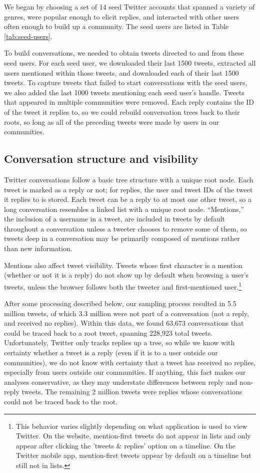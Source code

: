 \documentclass[11pt,letterpaper]{article}
\begin{document}
We began by choosing a set of 14 seed Twitter accounts that spanned a variety of genres, were popular enough to elicit replies, and interacted with other users often enough to build up a community.  The seed users are listed in Table \ref{tab:seed-users}.  

To build conversations, we needed to obtain tweets directed to and from these seed users. For each seed user, we downloaded their last 1500 tweets, extracted all users mentioned within those tweets, and downloaded each of their last 1500 tweets.  To capture tweets that failed to start conversations with the seed users, we also added the last 1000 tweets mentioning each seed user's handle.  Tweets that appeared in multiple communities were removed.  Each reply contains the ID of the tweet it replies to, so we could rebuild conversation trees back to their roots, so long as all of the preceding tweets were made by users in our communities.

\subsection{Conversation structure and visibility}\label{sect:conversation}

Twitter conversations follow a basic tree structure with a unique root node. Each tweet is marked as a reply or not; for replies, the user and tweet IDs of the tweet it replies to is stored. Each tweet can be a reply to at most one other tweet, so a long conversation resembles a linked list with a unique root node. ``Mentions,'' the inclusion of a username in a tweet, are included in tweets by default throughout a conversation unless a tweeter chooses to remove some of them, so tweets deep in a conversation may be primarily composed of mentions rather than new information.  

Mentions also affect tweet visibility.  Tweets whose first character is a mention (whether or not it is a reply) do not show up by default when browsing a user's tweets, unless the browser follows both the tweeter and first-mentioned user.\footnote{This behavior varies slightly depending on what application is used to view Twitter.  On the website, mention-first tweets do not appear in lists and only appear after clicking the 'tweets \& replies' option on a timeline. On the Twitter mobile app, mention-first tweets appear by default on a timeline but still not in lists.}

After some processing described below, our sampling process resulted in 5.5 million tweets, of which 3.3 million were not part of a conversation (not a reply, and received no replies).  Within this data, we found 63,673 conversations that could be traced back to a root tweet, spanning 228,923 total tweets. Unfortunately, Twitter only tracks replies up a tree, so while we know with certainty whether a tweet is a reply (even if it is to a user outside our communities), we do not know with certainty that a tweet has received no replies, especially from users outside our communities. If anything, this fact makes our analyses conservative, as they may understate differences between reply and non-reply tweets. The remaining 2 million tweets were replies whose conversations could not be traced back to the root.
\end{document}
